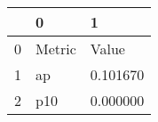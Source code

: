 \begin{tabular}{lll}
\toprule
 & 0 & 1 \\
\midrule
0 & Metric & Value \\
1 & ap & 0.101670 \\
2 & p10 & 0.000000 \\
\bottomrule
\end{tabular}

